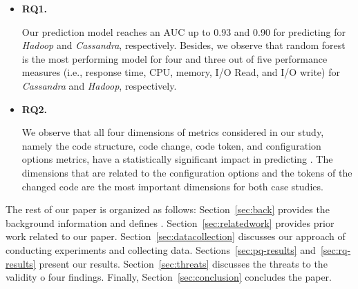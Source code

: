 \begin{itemize}
    
    \item \textbf{RQ1. \RQII}
    
    Our prediction model reaches an AUC up to 0.93 and 0.90 for predicting \inconsistent for \emph{Hadoop} and \emph{Cassandra}, respectively. Besides, we observe that random forest is the most performing model for four and three out of five performance measures (i.e., response time, CPU, memory, I/O Read, and I/O write) for \emph{Cassandra} and \emph{Hadoop}, respectively. 
    
    \item\textbf{RQ2. \RQIII}
    
    We observe that all four dimensions of metrics considered in our study, namely the code structure, code change, code token, and configuration options metrics, have a statistically significant impact in predicting \inconsistent. The dimensions that are related to the configuration options and the tokens of the changed code are the most important dimensions for both case studies. 
    
\end{itemize}

 The rest of our paper is organized as follows: Section~\ref{sec:back} provides the background information and defines \inconsistent. Section~\ref{sec:relatedwork} provides prior work related to our paper. Section~\ref{sec:datacollection} discusses our approach of conducting experiments and collecting data. Sections~\ref{sec:pq-results} and~\ref{sec:rq-results} present our results. Section~\ref{sec:threats} discusses the threats to the validity o four findings. Finally, Section~\ref{sec:conclusion} concludes the paper. 